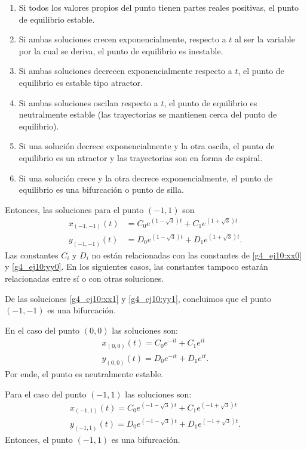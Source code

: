 \documentclass[../portafolio.tex]{subfiles}
\begin{document}
\begin{enumerate}
\item Si todos los valores propios del punto tienen partes reales positivas, el punto de equilibrio estable. 
\item Si ambas soluciones crecen exponencialmente, respecto a $t$ al ser la variable por la cual se deriva, el punto de equilibrio es inestable.
\item Si ambas soluciones decrecen exponencialmente respecto a $t$, el punto de equilibrio es estable tipo atractor.
\item Si ambas soluciones oscilan respecto a $t$, el punto de equilibrio es neutralmente estable (las trayectorias se mantienen cerca del punto de equilibrio).
\item Si una solución decrece exponencialmente y la otra oscila, el punto de equilibrio es un atractor y las trayectorias son en forma de espiral.
\item Si una solución crece y la otra decrece exponencialmente, el punto de equilibrio es una bifurcación o punto de silla.
\end{enumerate}

Entonces, las soluciones para el punto $(-1,1)$ son  
\begin{align}\label{g4_ej10:xx1}
x_{(-1,-1)}(t)&=C_0 e^{(1-\sqrt{3}) t} + C_1 e^{(1+\sqrt{3}) t}\\
y_{(-1,-1)}(t)&=D_0 e^{(1-\sqrt{3}) t} + D_1 e^{(1+\sqrt{3}) t}.\label{g4_ej10:yy1}
\end{align}
Las constantes $C_i$ y $D_i$ no están relacionadas con las constantes de \eqref{g4_ej10:xx0} y \eqref{g4_ej10:yy0}. En los siguientes casos, las constantes tampoco estarán relacionadas entre sí o con otras soluciones.

De las soluciones \eqref{g4_ej10:xx1} y \eqref{g4_ej10:yy1}, concluimos que el punto $(-1,-1)$ es una bifurcación.

En el caso del punto $(0,0)$ las soluciones son:
\begin{align}\label{g4_ej10:xx2}
x_{(0,0)}(t)=C_0 e^{-i t} + C_1 e^{i t}\\
y_{(0,0)}(t)=D_0 e^{-i t} + D_1 e^{i t}.\label{g4_ej10:yy2}
\end{align}
Por ende, el punto es neutralmente estable.

Para el caso del punto $(-1,1)$ las soluciones son:
\begin{align}\label{g4_ej10:xx3}
x_{(-1,1)}(t)=C_0 e^{(-1-\sqrt{3}) t} + C_1 e^{(-1+\sqrt{3}) t}\\
y_{(-1,1)}(t)=D_0 e^{(-1-\sqrt{3}) t} + D_1 e^{(-1+\sqrt{3}) t}.\label{g4_ej10:yy3}
\end{align}
Entonces, el punto $(-1,1)$ es una bifurcación.
\end{document}
